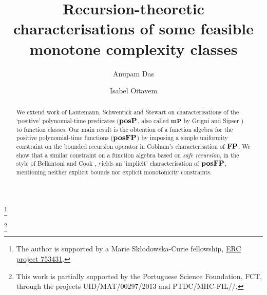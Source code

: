 \documentclass{lmcs}
\begin{document}
\title{Recursion-theoretic characterisations of some feasible monotone complexity classes}

\author[A.~Das]{Anupam Das}	%
\address{University of Copenhagen, Denmark}	%
\thanks{The author is supported by a Marie Sk\l{}odowska-Curie fellowship, \href{http://cordis.europa.eu/project/rcn/209401_en.html}{ERC project 753431}.}	%

\author[I.~Oitavem]{Isabel Oitavem}
\address{CMA and DM, FCT, Universidade Nova de Lisboa}
\thanks{This work is partially supported by the Portuguese Science Foundation, FCT, through the projects UID/MAT/00297/2013 and PTDC/\allowbreak MHC-\allowbreak FIL//.}




\begin{abstract}
We extend work of Lautemann, Schwentick and Stewart \cite{LautemannSS96:on-pos-p} on characterisations of the `positive' polynomial-time predicates ($\mathbf{pos}\mathbf{P}$, also called $\mathbf{mP}$ by Grigni and Sipser \cite{Grigni:1992:MC:167687.167706}) to function classes. 
Our main result is the obtention of a function algebra for the positive polynomial-time functions ($\mathbf{pos}\mathbf{FP}$) by imposing a simple uniformity constraint on the bounded recursion operator in Cobham's characterisation of $\mathbf{FP}$.
We show that a similar constraint on a function algebra based on \emph{safe recursion}, in the style of Bellantoni and Cook \cite{BelCoo92}, yields an `implicit' characterisation of $\mathbf{pos}\mathbf{FP}$, mentioning neither explicit bounds nor explicit monotonicity constraints.
 \end{abstract}
\end{document}
